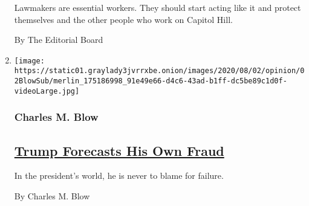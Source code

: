 \begin{enumerate}
  Lawmakers are essential workers. They should start acting like it and
  protect themselves and the other people who work on Capitol Hill.

  By The Editorial Board
\item
  \texttt{[image: https://static01.graylady3jvrrxbe.onion/images/2020/08/02/opinion/02BlowSub/merlin\_175186998\_91e49e66-d4c6-43ad-b1ff-dc5be89c1d0f-videoLarge.jpg]}

  \hypertarget{charles-m-blow}{%
  \subsubsection{Charles M. Blow}\label{charles-m-blow}}

  \hypertarget{trump-forecasts-his-own-fraud}{%
  \subsection{\texorpdfstring{\href{/2020/08/02/opinion/trump-2020-election.html}{Trump
  Forecasts His Own
  Fraud}}{Trump Forecasts His Own Fraud}}\label{trump-forecasts-his-own-fraud}}

  In the president's world, he is never to blame for failure.

  By Charles M. Blow
\end{enumerate}

